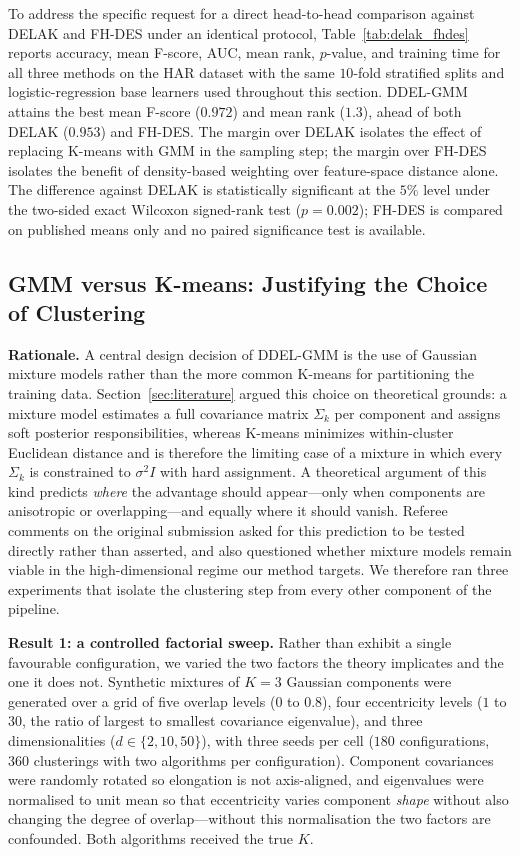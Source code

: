 \documentclass[lettersize,journal]{IEEEtran}
\begin{document}
	\noindent To address the specific request for a direct head-to-head comparison against DELAK and FH-DES under an identical protocol, Table~\ref{tab:delak_fhdes} reports accuracy, mean F-score, AUC, mean rank, $p$-value, and training time for all three methods on the HAR dataset with the same $10$-fold stratified splits and logistic-regression base learners used throughout this section. DDEL-GMM attains the best mean F-score ($0.972$) and mean rank ($1.3$), ahead of both DELAK ($0.953$) and FH-DES. The margin over DELAK isolates the effect of replacing K-means with GMM in the sampling step; the margin over FH-DES isolates the benefit of density-based weighting over feature-space distance alone. The difference against DELAK is statistically significant at the $5\%$ level under the two-sided exact Wilcoxon signed-rank test ($p = 0.002$); FH-DES is compared on published means only and no paired significance test is available.
	
	
	
		\subsection{GMM versus K-means: Justifying the Choice of Clustering}\label{subsec:gmm_vs_kmeans}
		
		\noindent \textbf{Rationale.} A central design decision of DDEL-GMM is the use of Gaussian mixture models rather than the more common K-means for partitioning the training data. Section~\ref{sec:literature} argued this choice on theoretical grounds: a mixture model estimates a full covariance matrix $\Sigma_k$ per component and assigns soft posterior responsibilities, whereas K-means minimizes within-cluster Euclidean distance and is therefore the limiting case of a mixture in which every $\Sigma_k$ is constrained to $\sigma^2 I$ with hard assignment. A theoretical argument of this kind predicts \emph{where} the advantage should appear---only when components are anisotropic or overlapping---and equally where it should vanish. Referee comments on the original submission asked for this prediction to be tested directly rather than asserted, and also questioned whether mixture models remain viable in the high-dimensional regime our method targets. We therefore ran three experiments that isolate the clustering step from every other component of the pipeline.
		
		\noindent \textbf{Result 1: a controlled factorial sweep.} Rather than exhibit a single favourable configuration, we varied the two factors the theory implicates and the one it does not. Synthetic mixtures of $K=3$ Gaussian components were generated over a grid of five overlap levels ($0$ to $0.8$), four eccentricity levels ($1$ to $30$, the ratio of largest to smallest covariance eigenvalue), and three dimensionalities ($d \in \{2,10,50\}$), with three seeds per cell ($180$ configurations, $360$ clusterings with two algorithms per configuration). Component covariances were randomly rotated so elongation is not axis-aligned, and eigenvalues were normalised to unit mean so that eccentricity varies component \emph{shape} without also changing the degree of overlap---without this normalisation the two factors are confounded. Both algorithms received the true $K$.
		
\end{document}
